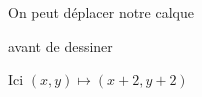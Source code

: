 \documentclass[preview]{standalone}
\begin{document}
\begin{center}
On peut déplacer notre calque

avant de dessiner

Ici $(x,y) \mapsto (x + 2, y + 2)$
\end{center}
\end{document}
